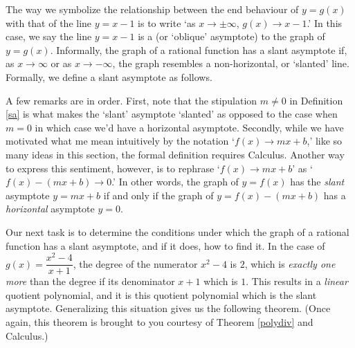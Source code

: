 The way we symbolize the relationship between the end behaviour of $y=g(x)$ with that of the line $y=x-1$ is to write `as $x \rightarrow \pm \infty$, $g(x)  \to x-1$.'  In this case, we say the line $y=x-1$ is a     (or `oblique' asymptote)  to the graph of $y=g(x)$.  Informally, the graph of a rational function has a slant asymptote if, as $x \rightarrow \infty$ or as $x \rightarrow -\infty$, the graph resembles a non-horizontal, or `slanted' line.  Formally, we define a slant asymptote as follows.


\medskip



\medskip


A few remarks are in order.  First, note that the stipulation $m \neq 0$ in Definition \ref{sa} is what makes the `slant' asymptote `slanted' as opposed to the case when $m=0$ in which case we'd have a horizontal asymptote.  Secondly, while we have motivated what me mean intuitively by the notation `$f(x)  \rightarrow mx+b$,' like so many ideas in this section, the formal definition requires Calculus.  Another way to express this sentiment, however, is to rephrase `$f(x)  \rightarrow mx+b$' as `$f(x) - (mx+b) \rightarrow 0$.'  In other words, the graph of $y=f(x)$ has the \textit{slant} asymptote $y = mx+b$ if and only if the graph of $y = f(x) - (mx+b)$ has a \textit{horizontal} asymptote $y=0$.


Our next task is to determine the conditions under which the graph of a rational function has a slant asymptote, and if it does, how to find it.  In the case of $g(x) = \dfrac{x^2-4}{x+1}$, the degree of the numerator $x^2-4$ is $2$, which is \textit{exactly one more} than the degree if its denominator $x+1$ which is $1$.  This results in a \textit{linear} quotient polynomial, and it is this quotient polynomial which is the slant asymptote.  Generalizing this situation gives us the following theorem. (Once again, this theorem is brought to you courtesy of Theorem \ref{polydiv} and Calculus.)

\medskip


